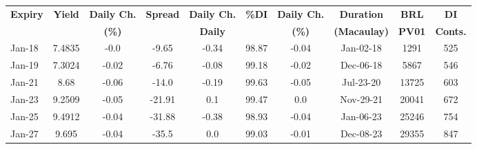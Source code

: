 \documentclass[article,crop=false]{standalone}%
\begin{document}
%
\normalsize%
\setlength{\tabcolsep}{0.15cm}%
\begin{tabular}[h]{l|c c|c c|c c|c c c}%
\hline%
\rowcolor{white}%
\textbf{Expiry}&\textbf{Yield}&\textbf{Daily Ch.}&\textbf{Spread}&\textbf{Daily Ch.}&\textbf{\%DI}&\textbf{Daily Ch.}&\textbf{Duration}&\textbf{BRL}&\textbf{DI}\\%
\rowcolor{white}%
\textbf{}&\textbf{}&\textbf{(\%)}&\textbf{}&\textbf{Daily}&\textbf{}&\textbf{(\%)}&\textbf{(Macaulay)}&\textbf{PV01}&\textbf{Conts.}\\%
\hline%
\rowcolor{lightgray}%
Jan{-}18&7.4835&{-}0.0&{-}9.65&{-}0.34&98.87&{-}0.04&Jan{-}02{-}18&1291&525\\%
\rowcolor{white}%
Jan{-}19&7.3024&{-}0.02&{-}6.76&{-}0.08&99.18&{-}0.02&Dec{-}06{-}18&5867&546\\%
\rowcolor{lightgray}%
Jan{-}21&8.68&{-}0.06&{-}14.0&{-}0.19&99.63&{-}0.05&Jul{-}23{-}20&13725&603\\%
\rowcolor{white}%
Jan{-}23&9.2509&{-}0.05&{-}21.91&0.1&99.47&0.0&Nov{-}29{-}21&20041&672\\%
\rowcolor{lightgray}%
Jan{-}25&9.4912&{-}0.04&{-}31.88&{-}0.38&98.93&{-}0.04&Jan{-}06{-}23&25246&754\\%
\rowcolor{white}%
Jan{-}27&9.695&{-}0.04&{-}35.5&0.0&99.03&{-}0.01&Dec{-}08{-}23&29355&847\\%
\hline%
\end{tabular}%
\end{document}
